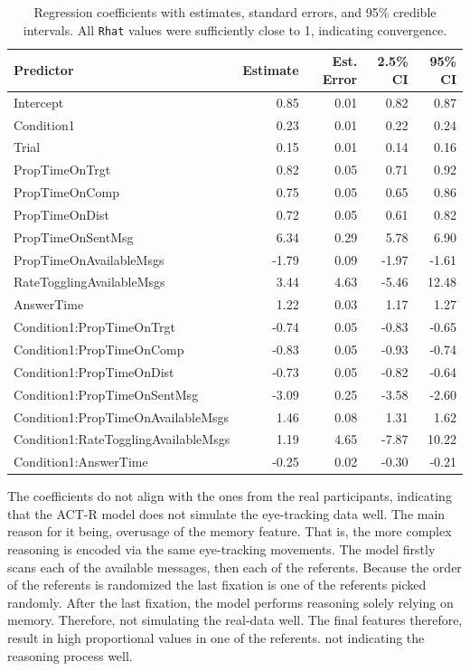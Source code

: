 \begin{table}[ht]
\centering
\begin{tabular}{lrrrr}
\hline
\textbf{Predictor} & \textbf{Estimate} & \textbf{Est. Error} & \textbf{2.5\% CI} & \textbf{95\% CI} \\
\hline
Intercept                               & 0.85 & 0.01 & 0.82  & 0.87  \\
Condition1                              & 0.23 & 0.01 & 0.22  & 0.24  \\
Trial                                  & 0.15 & 0.01 & 0.14  & 0.16  \\
PropTimeOnTrgt                         & 0.82 & 0.05 & 0.71  & 0.92  \\
PropTimeOnComp                         & 0.75 & 0.05 & 0.65  & 0.86  \\
PropTimeOnDist                         & 0.72 & 0.05 & 0.61  & 0.82  \\
PropTimeOnSentMsg                      & 6.34 & 0.29 & 5.78  & 6.90  \\
PropTimeOnAvailableMsgs               & -1.79 & 0.09 & -1.97 & -1.61 \\
RateTogglingAvailableMsgs              & 3.44 & 4.63 & -5.46 & 12.48 \\
AnswerTime                            & 1.22 & 0.03 & 1.17  & 1.27  \\
Condition1:PropTimeOnTrgt             & -0.74 & 0.05 & -0.83 & -0.65 \\
Condition1:PropTimeOnComp             & -0.83 & 0.05 & -0.93 & -0.74 \\
Condition1:PropTimeOnDist             & -0.73 & 0.05 & -0.82 & -0.64 \\
Condition1:PropTimeOnSentMsg          & -3.09 & 0.25 & -3.58 & -2.60 \\
Condition1:PropTimeOnAvailableMsgs    & 1.46 & 0.08 & 1.31  & 1.62  \\
Condition1:RateTogglingAvailableMsgs  & 1.19 & 4.65 & -7.87 & 10.22 \\
Condition1:AnswerTime                 & -0.25 & 0.02 & -0.30 & -0.21 \\
\hline
\end{tabular}
\caption{Regression coefficients with estimates, standard errors, and 95\% credible intervals. All \texttt{Rhat} values were sufficiently close to 1, indicating convergence.}
\label{tab:actr_model_coefficients}
\end{table}

The coefficients do not align with the ones from the real participants, indicating that the ACT-R model does not simulate the eye-tracking data well. The main reason for it being, overusage of the memory feature. That is, the more complex reasoning is encoded via the same eye-tracking movements. The model firstly scans each of the available messages, then each of the referents. Because the order of the referents is randomized the last fixation is one of the referents picked randomly. After the last fixation, the model performs reasoning solely relying on memory. Therefore, not simulating the real-data well. The final features therefore, result in high proportional values in one of the referents. not indicating the reasoning process well.

